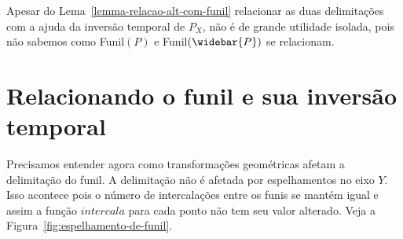 Apesar do Lema~\ref{lemma-relacao-alt-com-funil} relacionar as duas delimitações com a ajuda da inversão temporal de $P_X$, não é de grande utilidade isolada, pois não sabemos como Funil$(P)$ e Funil$(\widebar{P})$ se relacionam.

\section{Relacionando o funil e sua inversão temporal}

Precisamos entender agora como transformações geométricas afetam a delimitação do funil. A delimitação não é afetada por espelhamentos no eixo $Y$. Isso acontece pois o número de intercalações entre os funis se mantém igual e assim a função $intercala$ para cada ponto não tem seu valor alterado. Veja a Figura~\ref{fig:espelhamento-de-funil}.

